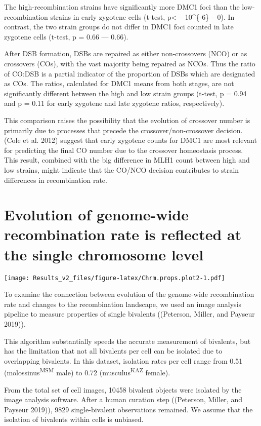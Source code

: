 \documentclass[]{article}
\begin{document}
The high-recombination strains have significantly more DMC1 foci than
the low-recombination strains in early zygotene cells (t-test,
p\textless{} -- 10\^{}\{-6\} -- 0). In contrast, the two strain groups
do not differ in DMC1 foci counted in late zygotene cells (t-test, p =
0.66 --- 0.66).

After DSB formation, DSBs are repaired as either non-crossovers (NCO) or
as crossovers (COs), with the vast majority being repaired as NCOs. Thus
the ratio of CO:DSB is a partial indicator of the proportion of DSBs
which are designated as COs. The ratios, calculated for DMC1 means from
both stages, are not significantly different between the high and low
strain groups (t-test, p = 0.94 and p = 0.11 for early zygotene and late
zygotene ratios, respectively).

This comparison raises the possibility that the evolution of crossover
number is primarily due to processes that precede the
crossover/non-crossover decision. (Cole et al. 2012) suggest that early
zygotene counts for DMC1 are most relevant for predicting the final CO
number due to the crossover homeostasis process. This result, combined
with the big difference in MLH1 count between high and low strains,
might indicate that the CO/NCO decision contributes to strain
differences in recombination rate.

\section{Evolution of genome-wide recombination rate is reflected at the
single chromosome
level}\label{evolution-of-genome-wide-recombination-rate-is-reflected-at-the-single-chromosome-level}

\texttt{[image: Results\_v2\_files/figure-latex/Chrm.props.plot2-1.pdf]}

To examine the connection between evolution of the genome-wide
recombination rate and changes to the recombination landscape, we used
an image analysis pipeline to measure properties of single bivalents
((Peterson, Miller, and Payseur 2019)).

 This algorithm substantially speeds the accurate measurement of
bivalents, but has the limitation that not all bivalents per cell can be
isolated due to overlapping bivalents. In this dataset, isolation rates
per cell range from 0.51 (molossinus\textsuperscript{MSM} male) to 0.72
(musculus\textsuperscript{KAZ} female).

From the total set of cell images, 10458 bivalent objects were isolated
by the image analysis software. After a human curation step ((Peterson,
Miller, and Payseur 2019)), 9829 single-bivalent observations remained.
We assume that the isolation of bivalents within cells is unbiased.
\end{document}
